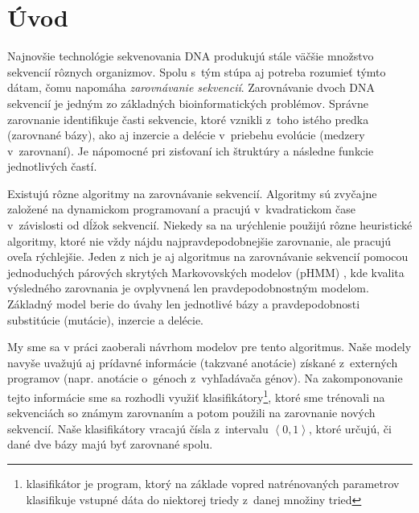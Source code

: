 \chapter*{Úvod}
{}

Najnovšie technológie sekvenovania DNA produkujú stále väčšie množstvo sekvencií rôznych organizmov. Spolu s~tým stúpa aj potreba rozumieť týmto dátam, čomu napomáha \textit{zarovnávanie sekvencií}.
Zarovnávanie dvoch DNA sekvencií je jedným zo základných
bioinformatických problémov. Správne zarovnanie identifikuje časti
sekvencie, ktoré vznikli z~toho istého predka (zarovnané bázy), ako aj
inzercie a delécie v~priebehu evolúcie (medzery v~zarovnaní).
Je nápomocné pri zisťovaní ich štruktúry a následne funkcie jednotlivých častí.

Existujú rôzne algoritmy na zarovnávanie sekvencií.
Algoritmy sú zvyčajne založené na dynamickom programovaní a pracujú v~kvadratickom čase v~závislosti od dĺžok sekvencií. Niekedy sa na urýchlenie použijú rôzne heuristické algoritmy, ktoré nie vždy nájdu najpravdepodobnejšie zarovnanie, ale pracujú oveľa rýchlejšie. Jeden z nich je aj algoritmus na zarovnávanie sekvencií pomocou jednoduchých párových skrytých Markovovských modelov (pHMM) \cite{durbin}, kde kvalita výsledného zarovnania je ovplyvnená len pravdepodobnostným modelom.
Základný model berie do úvahy len jednotlivé bázy a pravdepodobnosti substitúcie (mutácie), inzercie a delécie.

My sme sa v práci zaoberali návrhom modelov pre tento algoritmus. Naše modely navyše uvažujú aj prídavné informácie (takzvané anotácie) získané z~externých programov (napr. anotácie o~génoch z~vyhľadávača génov). Na zakomponovanie tejto informácie sme sa rozhodli využiť klasifikátory\footnote{klasifikátor je program, ktorý na základe vopred natrénovaných parametrov klasifikuje vstupné dáta do niektorej triedy z~danej množiny tried}, ktoré  sme trénovali na sekvenciách so známym zarovnaním a potom použili na zarovnanie nových sekvencií. Naše klasifikátory vracajú čísla z~intervalu $\left<0, 1\right>$, ktoré určujú, či dané dve bázy majú byť zarovnané spolu.


